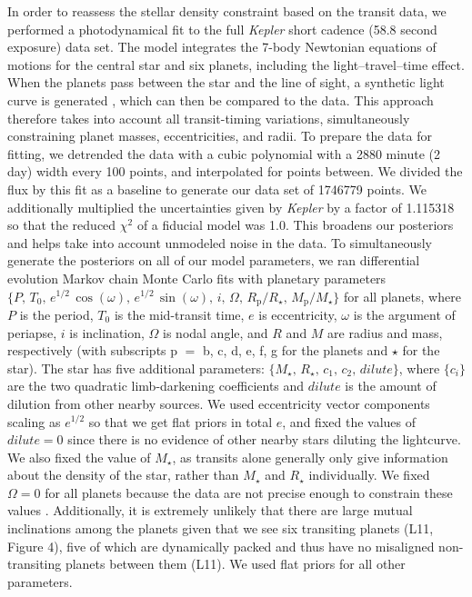 \documentclass[twocolumn]{aastex61}
\newcommand{\Kepler}{\textit{Kepler} }
\begin{document}
In order to reassess the stellar density constraint based on the transit data, we performed a photodynamical fit to the full \Kepler short cadence (58.8 second exposure) data set. The model integrates the 7-body Newtonian equations of motions for the central star and six planets, including the light--travel--time effect. When the planets pass between the star and the line of sight, a synthetic light curve is generated \citep{2012MNRAS.420.1630P}, which can then be compared to the data. This approach therefore takes into account all transit-timing variations, simultaneously constraining planet masses, eccentricities, and radii. To prepare the data for fitting, we detrended the data with a cubic polynomial with a 2880 minute (2 day) width every 100 points, and interpolated for points between. We divided the flux by this fit as a baseline to generate our data set of 1746779 points. We additionally multiplied the uncertainties given by \Kepler by a factor of 1.115318 so that the reduced $\chi^2$ of a fiducial model was 1.0. This broadens our posteriors and helps take into account unmodeled noise in the data. To simultaneously generate the posteriors on all of our model parameters, we ran differential evolution Markov chain Monte Carlo \cite[DEMCMC, ][]{TerBraak2005} fits with planetary parameters $\{P,\, T_0,\, e^{1/2} \, \cos(\omega),\, e^{1/2} \, \sin(\omega),\, i,\, \Omega,\, R_\mathrm{p}/R_\star,\, M_\mathrm{p}/M_\star\}$ for all planets, where $P$ is the period, $T_0$ is the mid-transit time, $e$ is eccentricity, $\omega$ is the argument of periapse, $i$ is inclination, $\Omega$ is nodal angle, and $R$ and $M$ are radius and mass, respectively (with subscripts p $=$ b, c, d, e, f, g for the planets and $\star$ for the star). The star has five additional parameters: $\{M_\star,\, R_\star,\, c_1,\, c_2,\, dilute\}$, where $\{c_i\}$ are the two quadratic limb-darkening coefficients and $dilute$ is the amount of dilution from other nearby sources. We used eccentricity vector components scaling as $e^{1/2}$ so that we get flat priors in total $e$, and fixed the values of $dilute=0$ since there is no evidence of other nearby stars diluting the lightcurve. We also fixed the value of $M_\star$, as transits alone generally only give information about the density of the star, rather than $M_\star$ and $R_\star$ individually. We fixed $\Omega = 0$ for all planets because the data are not precise enough to constrain these values \citep{Migaszewski2012}. Additionally, it is extremely unlikely that there are large mutual inclinations among the planets given that we see six transiting planets (L11, Figure 4), five of which are dynamically packed and thus have no misaligned non-transiting planets between them (L11). We used flat priors for all other parameters.
\end{document}
